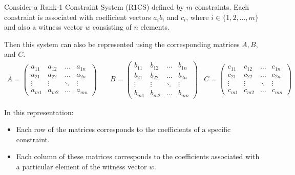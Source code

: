 \documentclass[../lecture-notes.tex]{subfiles}
\begin{document}
\begin{definition} 
    Consider a Rank-1 Constraint System (R1CS) defined by $m$ constraints. Each constraint is
    associated with coefficient vectors $a_i b_i$ and $c_i$, where $i \in \{1, 2, \dots, m\}$ and
    also a witness vector $w$ consisting of $n$ elements.

    Then this system can also be represented using the corresponding matrices $A, B,$ and $C$.
    \begin{align*}
        A = \begin{pmatrix}
            a_{11} & a_{12} & \dots & a_{1n} \\
            a_{21} & a_{22} & \dots & a_{2n} \\
            \vdots & \vdots & \ddots & \vdots \\
            a_{m1} & a_{m2} & \dots & a_{mn}
        \end{pmatrix} & \quad
        B = \begin{pmatrix}
            b_{11} & b_{12} & \dots & b_{1n} \\
            b_{21} & b_{22} & \dots & b_{2n} \\
            \vdots & \vdots & \ddots & \vdots \\
            b_{m1} & b_{m2} & \dots & b_{mn}
        \end{pmatrix} & 
        C = \begin{pmatrix}
            c_{11} & c_{12} & \dots & c_{1n} \\
            c_{21} & c_{22} & \dots & c_{2n} \\
            \vdots & \vdots & \ddots & \vdots \\
            c_{m1} & c_{m2} & \dots & c_{mn}
        \end{pmatrix}
    \end{align*}
    
    In this representation:
    \begin{itemize}
        \item Each row of the matrices corresponds to the coefficients of a specific constraint.
        \item Each column of these matrices corresponds to the coefficients associated with a 
        particular element of the witness vector $w$.
    \end{itemize}
\end{definition}
\end{document}
